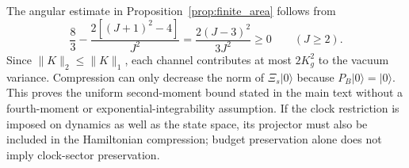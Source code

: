 The angular estimate in Proposition~\ref{prop:finite_area} follows from
\begin{equation}
\frac83-\frac{2[(J+1)^2-4]}{J^2}
=\frac{2(J-3)^2}{3J^2}\ge0\qquad(J\ge2).
\end{equation}
Since $\|K\|_2\le\|K\|_1$, each channel contributes at most $2K_g^2$ to the vacuum variance. Compression can only decrease the norm of $\Xi_s|0\rangle$ because $P_B|0\rangle=|0\rangle$. This proves the uniform second-moment bound stated in the main text without a fourth-moment or exponential-integrability assumption. If the clock restriction is imposed on dynamics as well as the state space, its projector must also be included in the Hamiltonian compression; budget preservation alone does not imply clock-sector preservation.
